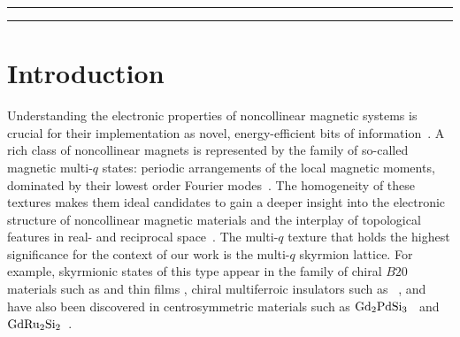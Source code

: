 \documentclass[submission, Phys]{SciPost}
\begin{document}
\vspace{10pt}
\noindent\rule{\textwidth}{1pt}
\setcounter{tocdepth}{2}
\tableofcontents\thispagestyle{fancy}
\noindent\rule{\textwidth}{1pt}
\vspace{10pt}

\section{Introduction}
\label{sec:introduction}

Understanding the electronic properties of noncollinear magnetic systems is crucial for their implementation as novel, energy-efficient bits of information~\cite{Fert2013, Fert2017, Back2020}. 
A rich class of noncollinear magnets is represented by the family of so-called magnetic multi-$q$ states: periodic arrangements of the local magnetic moments, dominated by their lowest order Fourier modes~\cite{Heinze2011,Hayami2021,Shimizu2022}.  
The homogeneity of these textures makes them ideal candidates to gain a deeper insight into the electronic structure of noncollinear magnetic materials and the interplay of topological features in real- and reciprocal space~\cite{Hamamoto2015,Gobel2017,Gobel2017b, Lux2024,Tome2021,Gong2021, Divic2022,Hayami2023}.
The multi-$q$ texture that holds the highest significance for the context of our work is the multi-$q$ skyrmion lattice. 
For example, skyrmionic states of this type appear in the family of chiral $B20$ materials such as  \cite{Muhlbauer2009, Neubauer2009} and  thin films \cite{Munzer2010,Yu2010}, chiral multiferroic insulators such as ~\cite{Seki2012, Langner2014}, and have also been discovered in centrosymmetric materials such as $\ce{Gd2PdSi3}$~\cite{Kurumaji2019} and $\ce{GdRu2Si2}$~\cite{Khanh2020}.
\end{document}
